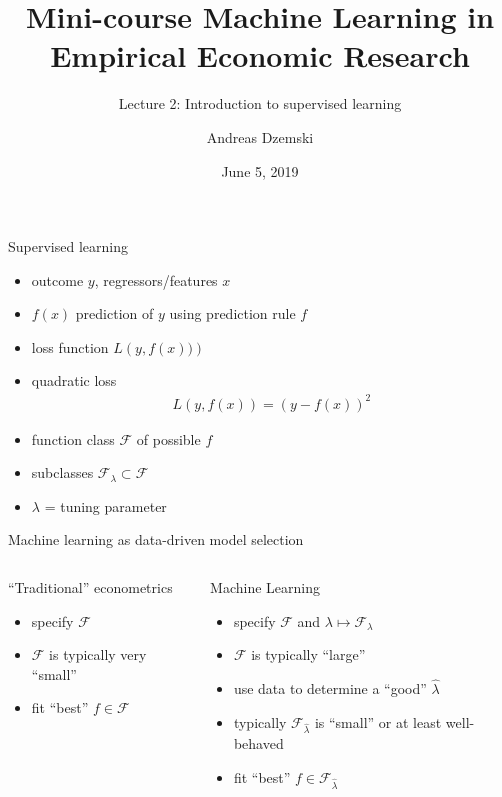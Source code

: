 \documentclass[xcolor=dvipsnames]{beamer}
\author[Dzemski]{Andreas Dzemski\inst{1}}
\institute{\inst{1} University of Gothenburg}
\title{Mini-course Machine Learning in Empirical Economic Research}
\subtitle{Lecture 2: Introduction to supervised learning}
\date{June 5, 2019}
\begin{document}
\maketitle

\begin{frame}{Supervised learning}
\begin{itemize}
    \item outcome $y$, regressors/features $x$
    \pause 
    \item $f(x)$ prediction of $y$ using prediction rule $f$
    \pause 
    \item loss function $L\left(y, f(x))\right)$
    \item quadratic loss
    \begin{align*}
      L\left(y, f(x)\right) =  \left(y - f(x) \right)^2 
    \end{align*}
    \pause 
    \item function class $\mathcal{F}$ of possible $f$
    \pause
    \item subclasses $\mathcal{F}_{\lambda} \subset \mathcal{F}$
    \item $\lambda$ = tuning parameter
  \end{itemize}  
\end{frame}

\begin{frame}{Machine learning as data-driven model selection}
\begin{columns}[t, onlytextwidth]
        \begin{block}{``Traditional'' econometrics}
        \begin{itemize}
          \item<1-> 
          specify $\mathcal{F}$
          \item<2-> 
          $\mathcal{F}$ is typically very ``small''
          \item<3-> 
          fit ``best'' $f \in \mathcal{F}$
        \end{itemize}
        \end{block}
        \begin{block}{Machine Learning}
        \begin{itemize}
          \item<1-> 
          specify $\mathcal{F}$ and $\lambda \mapsto \mathcal{F}_{\lambda}$
          \item<2-> 
          $\mathcal{F}$ is typically ``large''
          \item<4-> 
          use data to determine a ``good'' $\hat{\lambda}$
          \item<4->
          typically $\mathcal{F}_{\hat{\lambda}}$ is ``small'' or at least well-behaved
          \item<4-> 
          fit ``best'' $f \in \mathcal{F}_{\hat{\lambda}}$
        \end{itemize}
      \end{block}
\end{columns}
\end{frame}
\end{document}
